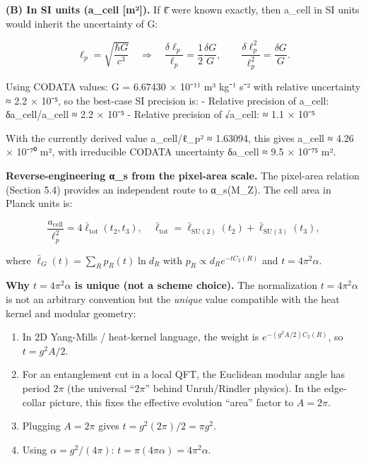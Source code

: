 \documentclass[
]{article}
\begin{document}
\textbf{(B) In SI units (a\_cell {[}m²{]}).} If ℓ̄ were known exactly,
then a\_cell in SI units would inherit the uncertainty of G:

\[
\ell_p = \sqrt{\frac{\hbar G}{c^3}} \quad \Rightarrow \quad
\frac{\delta \ell_p}{\ell_p} = \frac{1}{2}\frac{\delta G}{G}, \qquad
\frac{\delta \ell_p^2}{\ell_p^2} = \frac{\delta G}{G}.
\]

Using CODATA values: G = 6.67430 × 10⁻¹¹ m³ kg⁻¹ s⁻² with relative
uncertainty ≈ 2.2 × 10⁻⁵, so the best-case SI precision is: - Relative
precision of a\_cell: δa\_cell/a\_cell ≈ 2.2 × 10⁻⁵ - Relative precision
of √a\_cell: ≈ 1.1 × 10⁻⁵

With the currently derived value a\_cell/ℓ\_p² ≈ 1.63094, this gives
a\_cell ≈ 4.26 × 10⁻⁷⁰ m², with irreducible CODATA uncertainty δa\_cell
≈ 9.5 × 10⁻⁷⁵ m².

\textbf{Reverse-engineering α\_s from the pixel-area scale.} The
pixel-area relation (Section 5.4) provides an independent route to
α\_s(M\_Z). The cell area in Planck units is:

\[
\frac{a_{\mathrm{cell}}}{\ell_p^2} = 4 \bar{\ell}_{\mathrm{tot}}(t_2, t_3),
\quad
\bar{\ell}_{\mathrm{tot}} = \bar{\ell}_{\mathrm{SU}(2)}(t_2) + \bar{\ell}_{\mathrm{SU}(3)}(t_3),
\]

where \(\bar{\ell}_G(t) = \sum_R p_R(t) \ln d_R\) with
\(p_R \propto d_R e^{-t C_2(R)}\) and \(t = 4\pi^2 \alpha\).

\textbf{Why \(t = 4\pi^2 \alpha\) is unique (not a scheme choice).} The
normalization \(t = 4\pi^2 \alpha\) is not an arbitrary convention but
the \emph{unique} value compatible with the heat kernel and modular
geometry:

\begin{enumerate}
\def\labelenumi{\arabic{enumi}.}
\item
  In 2D Yang-Mills / heat-kernel language, the weight is
  \(e^{-(g^2 A/2) C_2(R)}\), so \(t = g^2 A / 2\).
\item
  For an entanglement cut in a local QFT, the Euclidean modular angle
  has period \(2\pi\) (the universal ``\(2\pi\)'' behind Unruh/Rindler
  physics). In the edge-collar picture, this fixes the effective
  evolution ``area'' factor to \(A = 2\pi\).
\item
  Plugging \(A = 2\pi\) gives \(t = g^2 (2\pi)/2 = \pi g^2\).
\item
  Using \(\alpha = g^2/(4\pi)\):
  \(t = \pi (4\pi \alpha) = 4\pi^2 \alpha\).
\end{enumerate}
\end{document}
